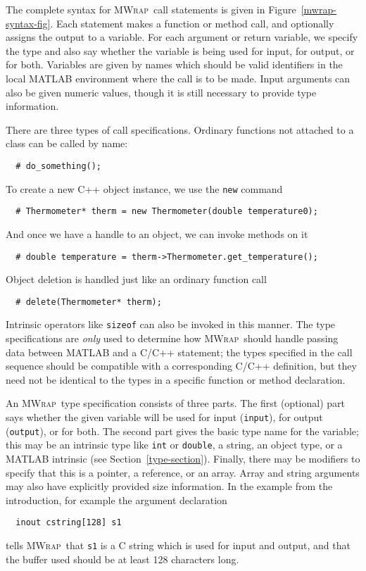 \documentclass[12pt]{article}
\newcommand{\mwrap}{\textsc{MWrap}}
\begin{document}
The complete syntax for \mwrap\ call statements is given in
Figure~\ref{mwrap-syntax-fig}.  Each statement makes a function or
method call, and optionally assigns the output to a variable.  For
each argument or return variable, we specify the type and also say
whether the variable is being used for input, for output, or for both.
Variables are given by names which should be valid identifiers in the
local MATLAB environment where the call is to be made.  Input
arguments can also be given numeric values, though it is still necessary
to provide type information.

There are three types of call specifications.  Ordinary functions
not attached to a class can be called by name:
\begin{verbatim}
  # do_something();
\end{verbatim}
To create a new C++ object instance, we use the {\tt new} command
\begin{verbatim}
  # Thermometer* therm = new Thermometer(double temperature0);
\end{verbatim}
And once we have a handle to an object, we can invoke methods on it
\begin{verbatim}
  # double temperature = therm->Thermometer.get_temperature();
\end{verbatim}
Object deletion is handled just like an ordinary function call
\begin{verbatim}
  # delete(Thermometer* therm);
\end{verbatim}
Intrinsic operators like {\tt sizeof} can also be invoked in this manner.
The type specifications are \emph{only} used to determine how \mwrap\
should handle passing data between MATLAB and a C/C++ statement;
the types specified in the call sequence should be compatible with 
a corresponding C/C++ definition, but they need not be identical to the
types in a specific function or method declaration.

An \mwrap\ type specification consists of three parts.  The first
(optional) part says whether the given variable will be used for input
({\tt input}), for output ({\tt output}), or for both.  The second
part gives the basic type name for the variable; this may be an
intrinsic type like {\tt int} or {\tt double}, a string, an object
type, or a MATLAB intrinsic (see Section~\ref{type-section}).
Finally, there may be modifiers to specify that this is a pointer, a
reference, or an array.  Array and string arguments may also have
explicitly provided size information.  In the example from the
introduction, for example the argument declaration
\begin{verbatim}
  inout cstring[128] s1
\end{verbatim}
tells \mwrap\ that {\tt s1} is a C string which is used for input and output,
and that the buffer used should be at least 128 characters long.
\end{document}
